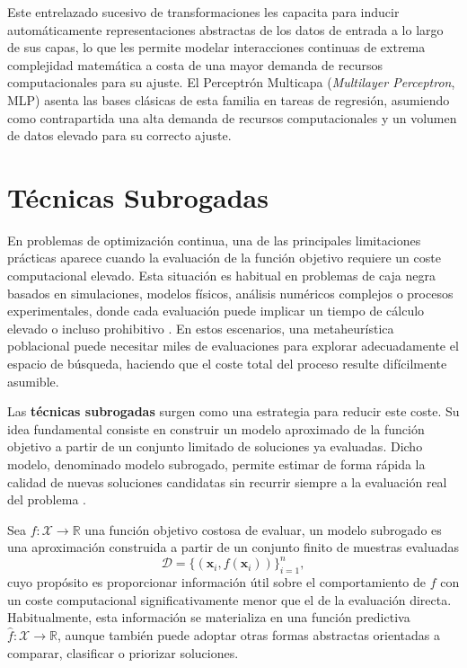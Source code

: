 Este entrelazado sucesivo de transformaciones les capacita para inducir automáticamente representaciones abstractas de los datos de entrada a lo largo de sus capas, lo que les permite modelar interacciones continuas de extrema complejidad matemática a costa de una mayor demanda de recursos computacionales para su ajuste. El Perceptrón Multicapa (\textit{Multilayer Perceptron}, MLP) asenta las bases clásicas de esta familia en tareas de regresión, asumiendo como contrapartida una alta demanda de recursos computacionales y un volumen de datos elevado para su correcto ajuste.

\section{Técnicas Subrogadas}
\label{sec:tecnicas_subrogadas}

En problemas de optimización continua, una de las principales limitaciones prácticas aparece cuando la evaluación de la función objetivo requiere un coste computacional elevado. Esta situación es habitual en problemas de caja negra basados en simulaciones, modelos físicos, análisis numéricos complejos o procesos experimentales, donde cada evaluación puede implicar un tiempo de cálculo elevado o incluso prohibitivo \cite{queipo2005surrogate}. En estos escenarios, una metaheurística poblacional puede necesitar miles de evaluaciones para explorar adecuadamente el espacio de búsqueda, haciendo que el coste total del proceso resulte difícilmente asumible.

Las \textbf{técnicas subrogadas} surgen como una estrategia para reducir este coste. Su idea fundamental consiste en construir un modelo aproximado de la función objetivo a partir de un conjunto limitado de soluciones ya evaluadas. Dicho modelo, denominado modelo subrogado, permite estimar de forma rápida la calidad de nuevas soluciones candidatas sin recurrir siempre a la evaluación real del problema \cite{jin2011surrogate}.

Sea \(f:\mathcal{X}\rightarrow\mathbb{R}\) una función objetivo costosa de evaluar, un modelo subrogado es una aproximación construida a partir de un conjunto finito de muestras evaluadas
\[
    \mathcal{D}=\{(\mathbf{x}_i,f(\mathbf{x}_i))\}_{i=1}^{n},
\]
cuyo propósito es proporcionar información útil sobre el comportamiento de \(f\) con un coste computacional significativamente menor que el de la evaluación directa. Habitualmente, esta información se materializa en una función predictiva \(\hat{f}:\mathcal{X}\rightarrow\mathbb{R}\), aunque también puede adoptar otras formas abstractas orientadas a comparar, clasificar o priorizar soluciones.

